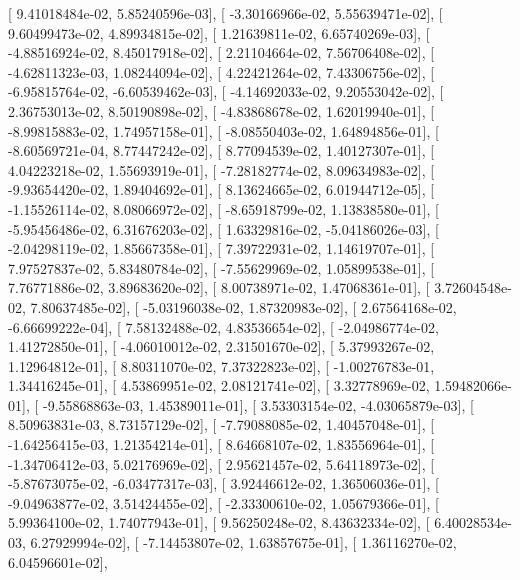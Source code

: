 \documentclass{article}
\begin{document}
       [  9.41018484e-02,   5.85240596e-03],
       [ -3.30166966e-02,   5.55639471e-02],
       [  9.60499473e-02,   4.89934815e-02],
       [  1.21639811e-02,   6.65740269e-03],
       [ -4.88516924e-02,   8.45017918e-02],
       [  2.21104664e-02,   7.56706408e-02],
       [ -4.62811323e-03,   1.08244094e-02],
       [  4.22421264e-02,   7.43306756e-02],
       [ -6.95815764e-02,  -6.60539462e-03],
       [ -4.14692033e-02,   9.20553042e-02],
       [  2.36753013e-02,   8.50190898e-02],
       [ -4.83868678e-02,   1.62019940e-01],
       [ -8.99815883e-02,   1.74957158e-01],
       [ -8.08550403e-02,   1.64894856e-01],
       [ -8.60569721e-04,   8.77447242e-02],
       [  8.77094539e-02,   1.40127307e-01],
       [  4.04223218e-02,   1.55693919e-01],
       [ -7.28182774e-02,   8.09634983e-02],
       [ -9.93654420e-02,   1.89404692e-01],
       [  8.13624665e-02,   6.01944712e-05],
       [ -1.15526114e-02,   8.08066972e-02],
       [ -8.65918799e-02,   1.13838580e-01],
       [ -5.95456486e-02,   6.31676203e-02],
       [  1.63329816e-02,  -5.04186026e-03],
       [ -2.04298119e-02,   1.85667358e-01],
       [  7.39722931e-02,   1.14619707e-01],
       [  7.97527837e-02,   5.83480784e-02],
       [ -7.55629969e-02,   1.05899538e-01],
       [  7.76771886e-02,   3.89683620e-02],
       [  8.00738971e-02,   1.47068361e-01],
       [  3.72604548e-02,   7.80637485e-02],
       [ -5.03196038e-02,   1.87320983e-02],
       [  2.67564168e-02,  -6.66699222e-04],
       [  7.58132488e-02,   4.83536654e-02],
       [ -2.04986774e-02,   1.41272850e-01],
       [ -4.06010012e-02,   2.31501670e-02],
       [  5.37993267e-02,   1.12964812e-01],
       [  8.80311070e-02,   7.37322823e-02],
       [ -1.00276783e-01,   1.34416245e-01],
       [  4.53869951e-02,   2.08121741e-02],
       [  3.32778969e-02,   1.59482066e-01],
       [ -9.55868863e-03,   1.45389011e-01],
       [  3.53303154e-02,  -4.03065879e-03],
       [  8.50963831e-03,   8.73157129e-02],
       [ -7.79088085e-02,   1.40457048e-01],
       [ -1.64256415e-03,   1.21354214e-01],
       [  8.64668107e-02,   1.83556964e-01],
       [ -1.34706412e-03,   5.02176969e-02],
       [  2.95621457e-02,   5.64118973e-02],
       [ -5.87673075e-02,  -6.03477317e-03],
       [  3.92446612e-02,   1.36506036e-01],
       [ -9.04963877e-02,   3.51424455e-02],
       [ -2.33300610e-02,   1.05679366e-01],
       [  5.99364100e-02,   1.74077943e-01],
       [  9.56250248e-02,   8.43632334e-02],
       [  6.40028534e-03,   6.27929994e-02],
       [ -7.14453807e-02,   1.63857675e-01],
       [  1.36116270e-02,   6.04596601e-02],
\end{document}
